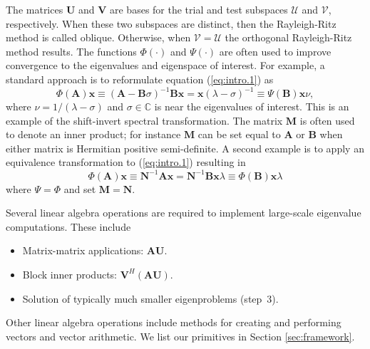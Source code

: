 \documentclass[acmtoms]{acmtrans2m}
\begin{document}
The matrices $\mathbf{U}$ and $\mathbf{V}$ are bases for the trial
and test subspaces $\mathcal{U}$ and $\mathcal{V}$, respectively.
When these two subspaces are distinct, then the Rayleigh-Ritz method is
called oblique. Otherwise, when $\mathcal{V} = \mathcal{U}$ the
orthogonal Rayleigh-Ritz method results. The functions $\Phi(\cdot)$
and $\Psi(\cdot)$ are often used to improve convergence to the
eigenvalues and eigenspace of interest. For example, a standard
approach is to reformulate equation (\ref{eq:intro.1}) as
$$
  \Phi(\mathbf{A}) \mathbf{x} \equiv
  (\mathbf{A}- \mathbf{B}\sigma)^{-1}\mathbf{B}\mathbf{x} =  \mathbf{x}
  (\lambda-\sigma)^{-1} \equiv \Psi(\mathbf{B})\mathbf{x} \nu ,
$$
where $\nu=1/(\lambda-\sigma)$ and $\sigma \in \mathbb{C}$ is near the 
eigenvalues of interest.
This is an example of the shift-invert spectral transformation. The
matrix $\mathbf{M}$ is often used to denote an inner product; for
instance $\mathbf{M}$ can be set equal to $\mathbf{A}$ or
$\mathbf{B}$ when either matrix is Hermitian positive semi-definite.
A second example is to apply an equivalence transformation to
(\ref{eq:intro.1}) resulting in
$$
   \Phi(\mathbf{A}) \mathbf{x} \equiv
   \mathbf{N}^{-1}\mathbf{A} \mathbf{x} = \mathbf{N}^{-1}\mathbf{B} \mathbf{x} \lambda
   \equiv \Phi(\mathbf{B})\mathbf{x}\lambda
$$
where $\Psi = \Phi$ and set $\mathbf{M}=\mathbf{N}$.

Several linear algebra operations are required to implement
large-scale eigenvalue computations. These include
\begin{itemize}
  \item Matrix-matrix applications: $\mathbf{A} \mathbf{U}$.
  \item Block inner products: $\mathbf{V}^H (\mathbf{A}\mathbf{U})$.
  \item Solution of typically much smaller eigenproblems (step~3).
\end{itemize}
Other linear algebra operations include methods for creating and
performing vectors and vector arithmetic. We list our primitives in
Section \ref{sec:framework}.
\end{document}
